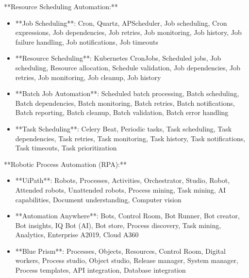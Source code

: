 \documentclass[11pt,a4paper]{article}
\begin{document}
**Resource Scheduling Automation:**

\begin{itemize}
\item **Job Scheduling**: Cron, Quartz, APScheduler, Job scheduling, Cron expressions, Job dependencies, Job retries, Job monitoring, Job history, Job failure handling, Job notifications, Job timeouts
\end{itemize}

\begin{itemize}
\item **Resource Scheduling**: Kubernetes CronJobs, Scheduled jobs, Job scheduling, Resource allocation, Schedule validation, Job dependencies, Job retries, Job monitoring, Job cleanup, Job history
\end{itemize}

\begin{itemize}
\item **Batch Job Automation**: Scheduled batch processing, Batch scheduling, Batch dependencies, Batch monitoring, Batch retries, Batch notifications, Batch reporting, Batch cleanup, Batch validation, Batch error handling
\end{itemize}

\begin{itemize}
\item **Task Scheduling**: Celery Beat, Periodic tasks, Task scheduling, Task dependencies, Task retries, Task monitoring, Task history, Task notifications, Task timeouts, Task prioritization
\end{itemize}

**Robotic Process Automation (RPA):**

\begin{itemize}
\item **UiPath**: Robots, Processes, Activities, Orchestrator, Studio, Robot, Attended robots, Unattended robots, Process mining, Task mining, AI capabilities, Document understanding, Computer vision
\end{itemize}

\begin{itemize}
\item **Automation Anywhere**: Bots, Control Room, Bot Runner, Bot creator, Bot insights, IQ Bot (AI), Bot store, Process discovery, Task mining, Analytics, Enterprise A2019, Cloud A360
\end{itemize}

\begin{itemize}
\item **Blue Prism**: Processes, Objects, Resources, Control Room, Digital workers, Process studio, Object studio, Release manager, System manager, Process templates, API integration, Database integration
\end{itemize}
\end{document}
